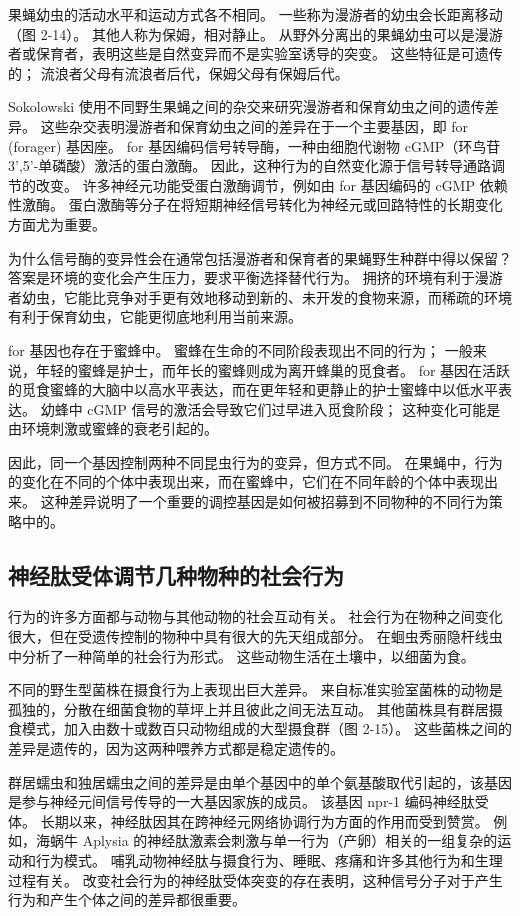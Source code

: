 果蝇幼虫的活动水平和运动方式各不相同。 一些称为漫游者的幼虫会长距离移动（图 2-14）。 其他人称为保姆，相对静止。 从野外分离出的果蝇幼虫可以是漫游者或保育者，表明这些是自然变异而不是实验室诱导的突变。 这些特征是可遗传的； 流浪者父母有流浪者后代，保姆父母有保姆后代。

Sokolowski 使用不同野生果蝇之间的杂交来研究漫游者和保育幼虫之间的遗传差异。 这些杂交表明漫游者和保育幼虫之间的差异在于一个主要基因，即 for (forager) 基因座。 for 基因编码信号转导酶，一种由细胞代谢物 cGMP（环鸟苷 3',5'-单磷酸）激活的蛋白激酶。 因此，这种行为的自然变化源于信号转导通路调节的改变。 许多神经元功能受蛋白激酶调节，例如由 for 基因编码的 cGMP 依赖性激酶。 蛋白激酶等分子在将短期神经信号转化为神经元或回路特性的长期变化方面尤为重要。

为什么信号酶的变异性会在通常包括漫游者和保育者的果蝇野生种群中得以保留？ 答案是环境的变化会产生压力，要求平衡选择替代行为。 拥挤的环境有利于漫游者幼虫，它能比竞争对手更有效地移动到新的、未开发的食物来源，而稀疏的环境有利于保育幼虫，它能更彻底地利用当前来源。

for 基因也存在于蜜蜂中。 蜜蜂在生命的不同阶段表现出不同的行为； 一般来说，年轻的蜜蜂是护士，而年长的蜜蜂则成为离开蜂巢的觅食者。 for 基因在活跃的觅食蜜蜂的大脑中以高水平表达，而在更年轻和更静止的护士蜜蜂中以低水平表达。 幼蜂中 cGMP 信号的激活会导致它们过早进入觅食阶段； 这种变化可能是由环境刺激或蜜蜂的衰老引起的。

因此，同一个基因控制两种不同昆虫行为的变异，但方式不同。 在果蝇中，行为的变化在不同的个体中表现出来，而在蜜蜂中，它们在不同年龄的个体中表现出来。 这种差异说明了一个重要的调控基因是如何被招募到不同物种的不同行为策略中的。


\subsection{神经肽受体调节几种物种的社会行为}
行为的许多方面都与动物与其他动物的社会互动有关。 社会行为在物种之间变化很大，但在受遗传控制的物种中具有很大的先天组成部分。 在蛔虫秀丽隐杆线虫中分析了一种简单的社会行为形式。 这些动物生活在土壤中，以细菌为食。

不同的野生型菌株在摄食行为上表现出巨大差异。 来自标准实验室菌株的动物是孤独的，分散在细菌食物的草坪上并且彼此之间无法互动。 其他菌株具有群居摄食模式，加入由数十或数百只动物组成的大型摄食群（图 2-15）。 这些菌株之间的差异是遗传的，因为这两种喂养方式都是稳定遗传的。

群居蠕虫和独居蠕虫之间的差异是由单个基因中的单个氨基酸取代引起的，该基因是参与神经元间信号传导的一大基因家族的成员。 该基因 npr-1 编码神经肽受体。 长期以来，神经肽因其在跨神经元网络协调行为方面的作用而受到赞赏。 例如，海蜗牛 Aplysia 的神经肽激素会刺激与单一行为（产卵）相关的一组复杂的运动和行为模式。 哺乳动物神经肽与摄食行为、睡眠、疼痛和许多其他行为和生理过程有关。 改变社会行为的神经肽受体突变的存在表明，这种信号分子对于产生行为和产生个体之间的差异都很重要。


